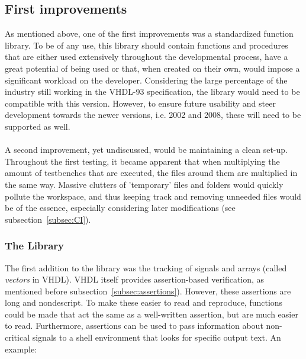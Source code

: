 \documentclass[11pt,british]{article}
\begin{document}
\subsection{First improvements}
As mentioned above, one of the first improvements was a standardized function library. To be of any use, this library should contain functions and procedures that are either used extensively throughout the developmental process, have a great potential of being used or that, when created on their own, would impose a significant workload on the developer. Considering the large percentage of the industry still working in the VHDL-93 specification, the library would need to be compatible with this version. However, to ensure future usability and steer development towards the newer versions, i.e. 2002 and 2008, these will need to be supported as well.\\
\\
A second improvement, yet undiscussed, would be maintaining a clean set-up. Throughout the first testing, it became apparent that when multiplying the amount of testbenches that are executed, the files around them are multiplied in the same way. Massive clutters of 'temporary' files and folders would quickly pollute the workspace, and thus keeping track and removing unneeded files would be of the essence, especially considering later modifications (see subsection~\ref{subsec:CI}).

\subsubsection{The Library}
\label{subsubsec:library}
The first addition to the library was the tracking of signals and arrays (called \emph{vectors} in VHDL). VHDL itself provides assertion-based verification, as mentioned before subsection~\ref{subsec:assertions}). However, these assertions are long and nondescript. To make these easier to read and reproduce, functions could be made that act the same as a well-written assertion, but are much easier to read. Furthermore, assertions can be used to pass information about non-critical signals to a shell environment that looks for specific output text. An example:
\end{document}
